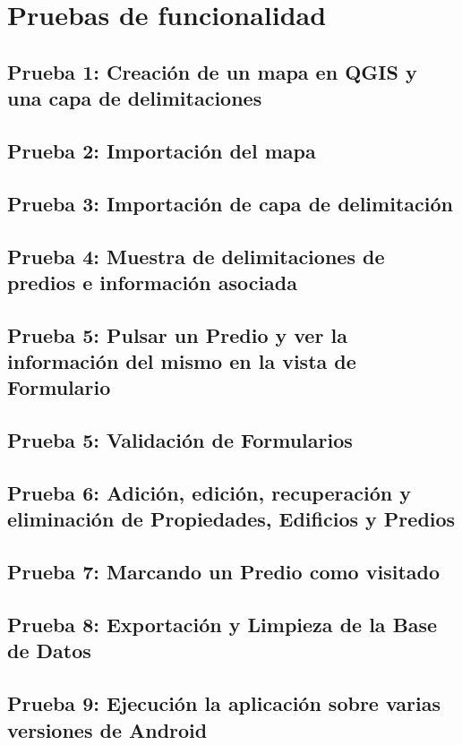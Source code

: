 \chapter{Pruebas de funcionalidad}\label{chapter:implementation}
\section{Prueba 1: Creación de un mapa en QGIS y una capa de delimitaciones }
\section{Prueba 2: Importación del mapa}
\section{Prueba 3: Importación de capa de delimitación}
\section{Prueba 4: Muestra de delimitaciones de predios e información asociada }
\section{Prueba 5: Pulsar un Predio y ver la información del mismo en la vista de Formulario}
\section{Prueba 5: Validación de Formularios}
\section{Prueba 6: Adición, edición, recuperación y eliminación de Propiedades, Edificios y Predios}
\section{Prueba 7: Marcando un Predio como visitado}
\section{Prueba 8: Exportación y Limpieza de la Base de Datos}
\section{Prueba 9: Ejecución la aplicación sobre varias versiones de Android}

